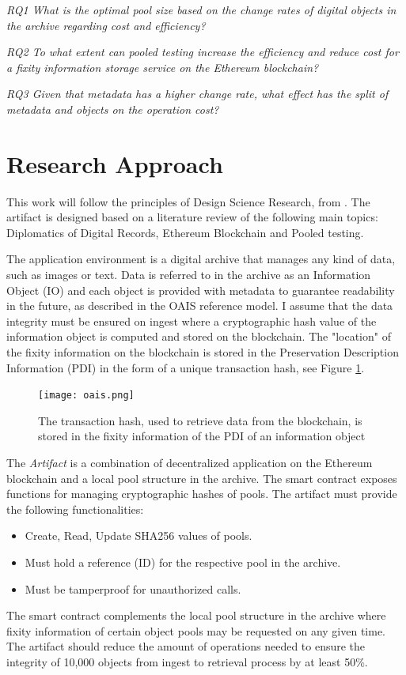 \textit{RQ1 What is the optimal pool size based on the change rates of digital objects in the archive regarding cost and efficiency?}

\textit{RQ2 To what extent can pooled testing increase the efficiency and reduce cost for a fixity information storage service on the Ethereum blockchain?}

\textit{RQ3 Given that metadata has a higher change rate, what effect has the split of metadata and objects on the operation cost?}

\section{Research Approach}
\label{sec:approach}
This work will follow the principles of Design Science Research, from \cite{hevner2007three}. The artifact is designed based on a literature review of the following main topics: Diplomatics of Digital Records, Ethereum Blockchain and Pooled testing.

The application environment is a digital archive that manages any kind of data, such as images or text. Data is referred to in the archive as an Information Object (IO) and each object is provided with metadata to guarantee readability in the future, as described in the OAIS reference model. I assume that the data integrity must be ensured on ingest where a cryptographic hash value of the information object is computed and stored on the blockchain. The "location" of the fixity information on the blockchain is stored in the Preservation Description Information (PDI) in the form of a unique transaction hash, see Figure \ref{fig:oais-fixity}. 

\begin{figure}[t]
  \centering
  \texttt{[image: oais.png]}
  \caption{The transaction hash, used to retrieve data from the blockchain, is stored in the fixity information of the PDI of an information object \cite[7]{lee2010open}}
  \label{fig:oais-fixity}
\end{figure}

The \textit{Artifact} is a combination of decentralized application on the Ethereum blockchain and a local pool structure in the archive. The smart contract exposes functions for managing cryptographic hashes of pools.
The artifact must provide the following functionalities:
\begin{itemize}
  \item Create, Read, Update SHA256 values of pools.
  \item Must hold a reference (ID) for the respective pool in the archive.
  \item Must be tamperproof for unauthorized calls.
\end{itemize}
The smart contract complements the local pool structure in the archive where fixity information of certain object pools may be requested on any given time. The artifact should reduce the amount of operations needed to ensure the integrity of 10,000 objects from ingest to retrieval process by at least 50\%.

